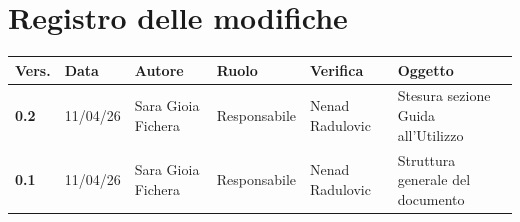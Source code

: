 \documentclass[a4paper,12pt]{article}
\begin{document}
    

    \section*{Registro delle modifiche} {
        \begin{table}[h!]
                \begin{tabularx}{\textwidth}{|l|l|l|l|L|L|}
                \hline
                \textbf{Vers.} & \textbf{Data} & \textbf{Autore} & \textbf{Ruolo} & \textbf{Verifica} & \textbf{Oggetto} \\
                \hline
                \textbf{0.2} & 11/04/26 & Sara Gioia Fichera & Responsabile & Nenad Radulovic & Stesura sezione Guida all'Utilizzo\\
                \hline
                \textbf{0.1} & 11/04/26 & Sara Gioia Fichera & Responsabile & Nenad Radulovic & Struttura generale del documento\\
                \hline
            \end{tabularx}
        \end{table}
    }
    \newpage
    
    \tableofcontents
    \newpage

    \listoffigures
    \newpage
    
    \listoftables
    \newpage
\end{document}
